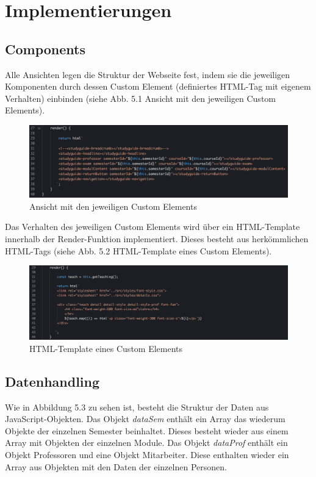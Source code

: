 \documentclass[12pt,					%
							 oneside,			%
							 a4paper,			%
							 halfparskip,		%
							 liststotoc,			%
							 bibtotoc,			%
							 fleqn,				%
							 pointlessnumbers]	%
							 {scrreprt}
\begin{document}
\chapter{Implementierungen}  

	\section{Components}
	Alle Ansichten legen die Struktur der Webseite fest, indem sie die jeweiligen Komponenten durch dessen Custom Element (definiertes HTML-Tag mit eigenem Verhalten) einbinden (siehe Abb. 5.1 Ansicht mit den jeweiligen Custom Elements). 
	
	\begin{figure}[h]
		\centering
		\includegraphics[width=1\textwidth]{pictures/custom-element.png}
		\caption{Ansicht mit den jeweiligen  Custom Elements}						
		\label{custom-element}
	\end{figure}
	
	Das Verhalten des jeweiligen Custom Elements wird über ein HTML-Template innerhalb der Render-Funktion implementiert. Dieses besteht aus herkömmlichen HTML-Tags (siehe Abb. 5.2 HTML-Template eines Custom Elements).

	\begin{figure}[h]
		\centering
		\includegraphics[width=1\textwidth]{pictures/html-template.png}
		\caption{HTML-Template eines Custom Elements}						
		\label{html-template}
	\end{figure}
	
	\section{Datenhandling}
	Wie in Abbildung 5.3 zu sehen ist, besteht die Struktur der Daten aus JavaScript-Objekten. Das Objekt \textit{dataSem} enthält ein Array das wiederum Objekte der einzelnen Semester beinhaltet. Dieses besteht wieder aus einem Array mit Objekten der einzelnen Module.  Das Objekt \textit{dataProf} enthält ein Objekt Professoren und eine Objekt Mitarbeiter. Diese enthalten wieder ein Array aus Objekten mit den Daten der einzelnen Personen.
	
\end{document}

